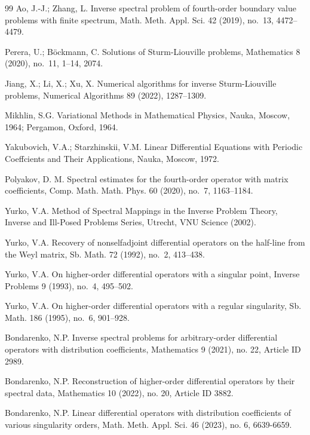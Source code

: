 \documentclass[a4paper,12pt]{article}
\theoremstyle{plain}
\numberwithin{equation}{section}
\theoremstyle{definition}
\theoremstyle{remark}
\begin{document}
\begin{thebibliography}{99}
Ao, J.-J.; Zhang, L. Inverse spectral problem of fourth-order boundary value problems with finite spectrum, Math. Meth. Appl. Sci. 42 (2019), no.~13, 4472--4479.

Perera, U.; B\"ockmann, C. Solutions of Sturm-Liouville problems, Mathematics 8 (2020), no.~11, 1--14, 2074.

Jiang, X.; Li, X.; Xu, X. Numerical algorithms for inverse Sturm-Liouville problems, Numerical Algorithms 89 (2022), 1287--1309.


Mikhlin, S.G. Variational Methods in Mathematical Physics, Nauka, Moscow, 1964; Pergamon, Oxford, 1964.

Yakubovich, V.A.; Starzhinskii, V.M. Linear Differential Equations with Periodic Coeffcients and Their Applications, Nauka, Moscow, 1972.

Polyakov, D. M. Spectral estimates for the fourth-order operator with matrix coefficients, Comp. Math. Math. Phys. 60 (2020), no.~7, 1163--1184.


Yurko, V.A. Method of Spectral Mappings in the Inverse Problem Theory, Inverse and Ill-Posed Problems Series, Utrecht, VNU Science (2002).

Yurko, V.A. Recovery of nonselfadjoint differential operators on the half-line from the Weyl matrix, Sb. Math. 72 (1992), no.~2, 413--438. 

Yurko, V.A. On higher-order differential operators with a singular point, Inverse Problems 9 (1993), no.~4, 495--502.

Yurko, V.A. On higher-order differential operators with a regular singularity, Sb. Math. 186 (1995), no.~6, 901--928.

Bondarenko, N.P. Inverse spectral problems for arbitrary-order differential operators with distribution coefficients, Mathematics 9 (2021), no. 22, Article ID 2989.

Bondarenko, N.P. Reconstruction of higher-order differential operators by their spectral data, Mathematics 10 (2022), no. 20, Article ID 3882.

Bondarenko, N.P. Linear differential operators with distribution coefficients of various singularity orders, Math. Meth. Appl. Sci. 46 (2023), no. 6, 6639-6659.


\end{thebibliography}
\end{document}
